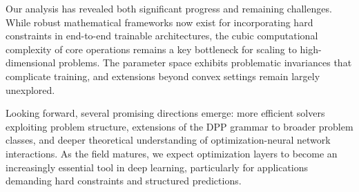 \documentclass{article}
\begin{document}
Our analysis has revealed both significant progress and remaining challenges. While robust mathematical frameworks now exist for incorporating hard constraints in end-to-end trainable architectures, the cubic computational complexity of core operations remains a key bottleneck for scaling to high-dimensional problems. The parameter space exhibits problematic invariances that complicate training, and extensions beyond convex settings remain largely unexplored.

Looking forward, several promising directions emerge: more efficient solvers exploiting problem structure, extensions of the DPP grammar to broader problem classes, and deeper theoretical understanding of optimization-neural network interactions. As the field matures, we expect optimization layers to become an increasingly essential tool in deep learning, particularly for applications demanding hard constraints and structured predictions.
\newpage








\newpage
\end{document}

